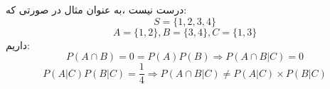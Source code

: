 درست نیست ،به عنوان مثال در صورتی که:
$$S = \{1 , 2 , 3 , 4 \}$$
$$A = \{1 , 2 \} , B =  \{3 , 4 \} , C =  \{1 , 3 \} $$
داریم:
$$ P ( A \cap B ) = 0 = P ( A ) P ( B )  \Rightarrow  P ( A \cap B  | C)=0$$
$$ P (A|C)  P(B|C) = \frac{1}{4}  \Rightarrow P(A \cap B | C) \neq P(A | C) \times P(B | C)$$
